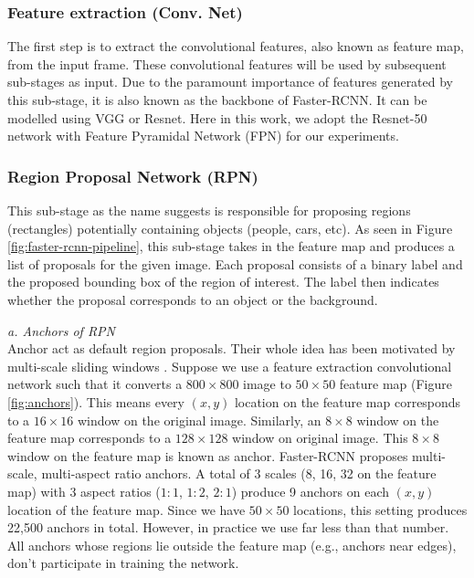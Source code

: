 \vspace{5pt}
\subsubsection{Feature extraction (Conv. Net)}
\label{sec:feature-extraction}
The first step is to extract the convolutional features, also known as feature map, from the input frame. These convolutional features will be used by subsequent sub-stages as input. Due to the paramount importance of features generated by this sub-stage, it is also known as the backbone of Faster-RCNN. It can be modelled using VGG\cite{simonyan2014very} or Resnet\cite{he2016deep}. Here in this work, we adopt the Resnet-50 network with Feature Pyramidal Network (FPN) \cite{lin2017feature} for our experiments. 

\vspace{5pt}
\subsubsection{Region Proposal Network (RPN)}
This sub-stage as the name suggests is responsible for proposing regions (rectangles) potentially containing objects (people, cars, etc). As seen in Figure \ref{fig:faster-rcnn-pipeline}, this sub-stage takes in the feature map and produces a list of proposals for the given image. Each proposal consists of a binary label and the proposed bounding box of the region of interest. The label then indicates whether the proposal corresponds to an object or the background. 

\vspace{5pt}
\textit{a. Anchors of RPN}\\
Anchor act as default region proposals. Their whole idea has been motivated by multi-scale sliding windows \cite{ref_fasterrcnn}. Suppose we use a feature extraction convolutional network such that it converts a $800\times800$ image to $50\times50$ feature map (Figure \ref{fig:anchors}). This means every $(x,y)$ location on the feature map corresponds to a $16\times16$ window on the original image. Similarly, an $8\times8$ window on the feature map corresponds to a $128\times128$ window on original image. This $8\times8$ window on the feature map is known as anchor. Faster-RCNN proposes multi-scale, multi-aspect ratio anchors. A total of 3 scales (8, 16, 32 on the feature map) with 3 aspect ratios ($1:1$, $1:2$, $2:1$) produce 9 anchors on each $(x,y)$ location of the feature map. Since we have $50\times50$ locations, this setting produces 22,500 anchors in total. However, in practice we use far less than that number. All anchors whose regions lie outside the feature map (e.g., anchors near edges), don't participate in training the network. 

